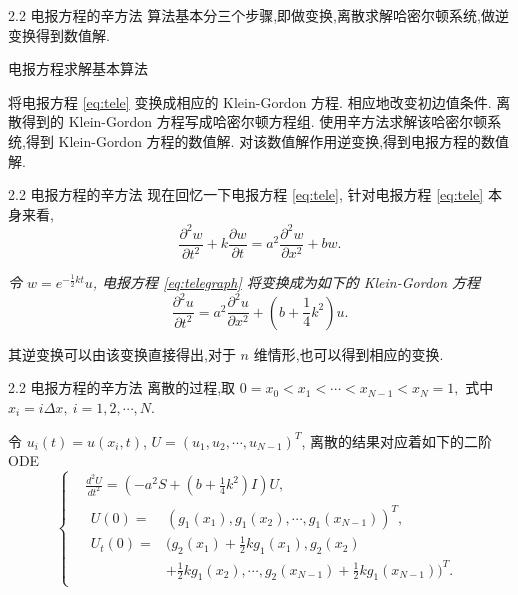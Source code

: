 \documentclass{beamer}
\begin{document}
\begin{frame}{2.2 电报方程的辛方法}
\qquad 算法基本分三个步骤,即做变换,离散求解哈密尔顿系统,做逆变换得到数值解.

\begin{block}{电报方程求解基本算法}
\begin{algorithmic}[1]
\STATE 将电报方程 \eqref{eq:tele} 变换成相应的 Klein-Gordon 方程. 相应地改变初边值条件. \newline
\STATE 离散得到的 Klein-Gordon 方程写成哈密尔顿方程组. 使用辛方法求解该哈密尔顿系统,得到 Klein-Gordon 方程的数值解. \newline
\STATE 对该数值解作用逆变换,得到电报方程的数值解.
\end{algorithmic}
\end{block}

\end{frame}

\begin{frame}{2.2 电报方程的辛方法}
现在回忆一下电报方程 \eqref{eq:tele}, 针对电报方程 \eqref{eq:tele} 本身来看,
\begin{equation}\label{eq:telegraph}
\frac{\partial ^2 w}{\partial t^2}+k\frac{\partial w}{\partial t}=a^2 \frac{\partial ^2 w}{\partial x^2} + b w.
\end{equation}

\begin{lemma}\label{thm:trans}
\emph{令 $w=e^{-\frac{1}{2}kt}u$, 电报方程 \eqref{eq:telegraph} 将变换成为如下的 Klein-Gordon 方程
\begin{equation}\label{eq:kg}
\frac{\partial ^2 u}{\partial t^2}=a^2 \frac{\partial ^2 u}{\partial x^2} + (b+\frac{1}{4}k^2) u.
\end{equation}}
\end{lemma}
其逆变换可以由该变换直接得出,对于 $n$ 维情形,也可以得到相应的变换.
\end{frame}

\begin{frame}{2.2 电报方程的辛方法}
\qquad 离散的过程,取 $0=x_0<x_1<\cdots<x_{N-1}<x_N=1,$ 式中 $x_i=i\Delta x,~i = 1,2,\cdots,N$.

\qquad 令 $u_i(t)=u(x_i,t)$, $U=(u_1,u_2,\cdots,u_{N-1})^T$, 离散的结果对应着如下的二阶 ODE
\begin{equation}\label{eq:aftert}
\left\lbrace
\begin{aligned}
&\frac{d^2U}{dt^2}=(-a^2 S+(b+\frac{1}{4}k^2)I) U,\\
&\begin{aligned}
U(0)=&(g_1(x_1),g_1(x_2),\cdots,g_1(x_{N-1}))^T,\\
U_t(0)=&(g_2(x_1)+\frac{1}{2}kg_1(x_1),g_2(x_2)\\
    &+\frac{1}{2}kg_1(x_2),\cdots,g_2(x_{N-1})+\frac{1}{2}kg_1(x_{N-1}))^T.
\end{aligned}
\end{aligned}
\right.
\end{equation}
\end{frame}
\end{document}
